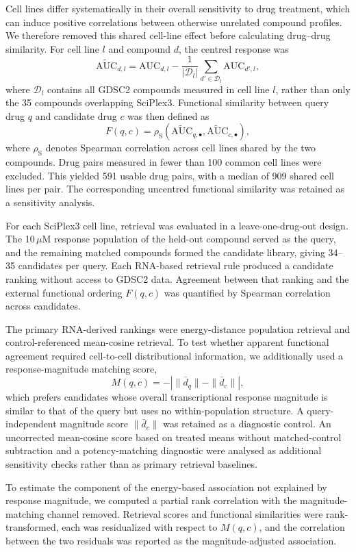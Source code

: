 \documentclass[11pt,letterpaper]{article}
\begin{document}
Cell lines differ systematically in their overall sensitivity to drug treatment, which can induce
positive correlations between otherwise unrelated compound profiles. We therefore removed this
shared cell-line effect before calculating drug--drug similarity. For cell line $l$ and compound
$d$, the centred response was
\[
\widetilde{\mathrm{AUC}}_{d,l}
=
\mathrm{AUC}_{d,l}
-
\frac{1}{|\mathcal D_l|}
\sum_{d'\in\mathcal D_l}\mathrm{AUC}_{d',l},
\]
where $\mathcal D_l$ contains all GDSC2 compounds measured in cell line $l$, rather than only the
35 compounds overlapping SciPlex3. Functional similarity between query drug $q$ and candidate
drug $c$ was then defined as
\[
F(q,c)
=
\rho_{\mathrm{S}}
\left(
\widetilde{\mathrm{AUC}}_{q,\bullet},
\widetilde{\mathrm{AUC}}_{c,\bullet}
\right),
\]
where $\rho_{\mathrm{S}}$ denotes Spearman correlation across cell lines shared by the two
compounds. Drug pairs measured in fewer than 100 common cell lines were excluded. This yielded
591 usable drug pairs, with a median of 909 shared cell lines per pair. The corresponding
uncentred functional similarity was retained as a sensitivity analysis.

For each SciPlex3 cell line, retrieval was evaluated in a leave-one-drug-out design. The
10\,$\mu$M response population of the held-out compound served as the query, and the remaining
matched compounds formed the candidate library, giving 34--35 candidates per query. Each RNA-based
retrieval rule produced a candidate ranking without access to GDSC2 data. Agreement between that
ranking and the external functional ordering $F(q,c)$ was quantified by Spearman correlation
across candidates.

The primary RNA-derived rankings were energy-distance population retrieval and control-referenced
mean-cosine retrieval. To test whether apparent functional agreement required cell-to-cell
distributional information, we additionally used a response-magnitude matching score,
\[
M(q,c)
=
-\left|
\|\bar d_q\|-\|\bar d_c\|
\right|,
\]
which prefers candidates whose overall transcriptional response magnitude is similar to that of
the query but uses no within-population structure. A query-independent magnitude score
$\|\bar d_c\|$ was retained as a diagnostic control. An uncorrected mean-cosine score based on
treated means without matched-control subtraction and a potency-matching diagnostic were analysed
as additional sensitivity checks rather than as primary retrieval baselines.

To estimate the component of the energy-based association not explained by response magnitude, we
computed a partial rank correlation with the magnitude-matching channel removed. Retrieval scores
and functional similarities were rank-transformed, each was residualized with respect to
$M(q,c)$, and the correlation between the two residuals was reported as the magnitude-adjusted
association.
\end{document}
